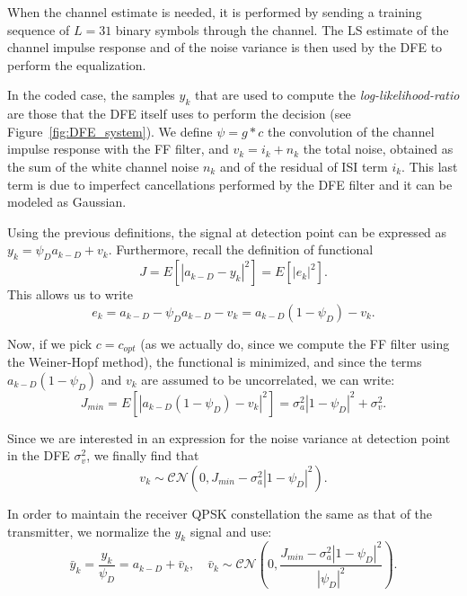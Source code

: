 \documentclass[10pt]{article}
\begin{document}
When the channel estimate is needed, it is performed by sending a training sequence of $L=31$ binary symbols through the channel. The LS estimate of the channel impulse response and of the noise variance is then used by the DFE to perform the equalization.

In the coded case, the samples $y_k$ that are used to compute the \emph{log-likelihood-ratio} are those that the DFE itself uses to perform the decision (see Figure~\ref{fig:DFE_system}). We define $\psi = g * c$ the convolution of the channel impulse response with the FF filter, and $v_k = i_k + n_k$ the total noise, obtained as the sum of the white channel noise $n_k$ and of the residual of ISI term $i_k$. This last term is due to imperfect cancellations performed by the DFE filter and it can be modeled as Gaussian.

Using the previous definitions, the signal at detection point can be expressed as $y_k = \psi_D a_{k-D} + v_k$. Furthermore, recall the definition of functional 
\begin{equation}
 	J = E[|a_{k-D} - y_k|^2] = E[|e_k|^2].
\end{equation}
This allows us to write 
\begin{equation}
	e_k = a_{k-D} - \psi_D a_{k-D} - v_k = a_{k-D} (1 - \psi_D) - v_k.
\end{equation}

Now, if we pick $c = c_{opt}$ (as we actually do, since we compute the FF filter using the Weiner-Hopf method), the functional is minimized, and since the terms $a_{k-D} (1 - \psi_D)$ and $v_k$ are assumed to be uncorrelated, we can write: 
\begin{equation}
	J_{min} = E[|a_{k-D} (1 - \psi_D) - v_k|^2] = \sigma_a^2 |1-\psi_D|^2 + \sigma_v^2.
\end{equation}

Since we are interested in an expression for the noise variance at detection point in the DFE $\sigma_v^2$, we finally find that 
\begin{equation}
	v_k \sim \mathcal{CN}(0, J_{min}-\sigma_a^2|1-\psi_D|^2).
\end{equation}

In order to maintain the receiver QPSK constellation the same as that of the transmitter, we normalize the $y_k$ signal and use:
\begin{equation}
 	 \bar{y}_k = \frac{y_k}{\psi_D} = a_{k-D} + \bar{v}_k, \quad \bar{v}_k \sim \mathcal{CN}\left(0, \frac{J_{min}-\sigma_a^2|1-\psi_D|^2}{|\psi_D|^2}\right).
 	 \label{eq:noisevar}
 \end{equation}
\end{document}
